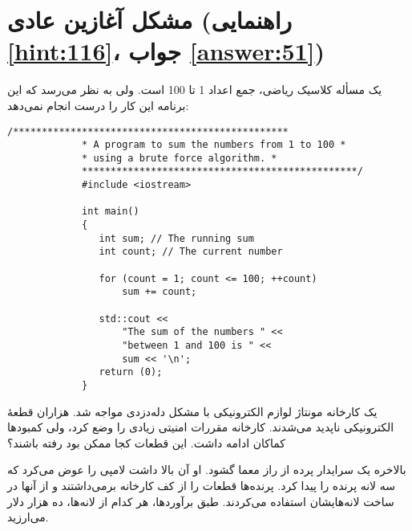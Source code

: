 \section[مشکل آغازین عادی]{مشکل آغازین عادی \protect{} (راهنمایی \ref{hint:116}، جواب \ref{answer:51})}
یک مسأله کلاسیک ریاضی، جمع اعداد 1 تا 100 است. ولی به نظر می‌رسد که این برنامه این کار را درست انجام نمی‌دهد:

\begin{LTR}
        \begin{lstlisting}[style=C++Style]
             /************************************************
             * A program to sum the numbers from 1 to 100 *
             * using a brute force algorithm. *
             ************************************************/
             #include <iostream>

             int main()
             {
             	int sum; // The running sum
             	int count; // The current number

             	for (count = 1; count <= 100; ++count)
             		sum += count;

             	std::cout <<
             		"The sum of the numbers " <<
            		"between 1 and 100 is " <<
             		sum << '\n';
             	return (0);
             }
        \end{lstlisting}
\end{LTR}

\begin{tcolorbox}
    یک کارخانه مونتاژ لوازم الکترونیکی با مشکل دله‌دزدی مواجه شد. هزاران قطعهٔ الکترونیکی ناپدید می‌شدند. کارخانه مقررات امنیتی زیادی را وضع کرد، ولی کمبودها کماکان ادامه داشت. این قطعات کجا ممکن بود رفته باشند؟

    بالاخره یک سرایدار پرده از راز معما گشود. او آن بالا داشت لامپی را عوض می‌کرد که سه لانه پرنده را پیدا کرد. پرنده‌ها قطعات را از کف کارخانه برمی‌داشتند و از آنها در ساخت لانه‌هایشان استفاده می‌کردند. طبق برآوردها، هر کدام از لانه‌ها، ده هزار دلار می‌ارزید.
\end{tcolorbox}